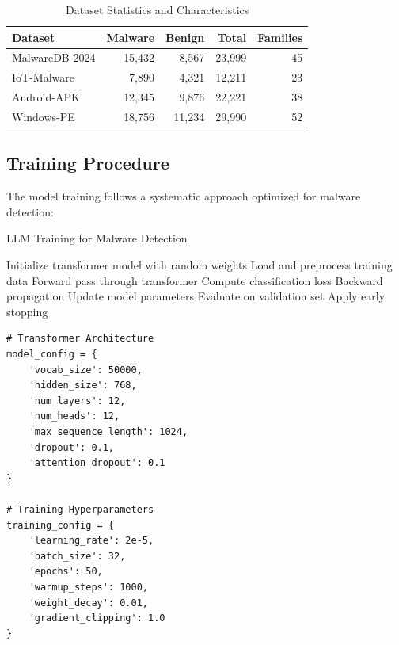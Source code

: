 \documentclass[12pt,a4paper]{article}
\begin{document}
\begin{table}[H]
    \centering
    \caption{Dataset Statistics and Characteristics}
    \begin{tabular}{@{}lrrrr@{}}
        \toprule
        Dataset        & Malware & Benign & Total  & Families \\
        \midrule
        MalwareDB-2024 & 15,432  & 8,567  & 23,999 & 45       \\
        IoT-Malware    & 7,890   & 4,321  & 12,211 & 23       \\
        Android-APK    & 12,345  & 9,876  & 22,221 & 38       \\
        Windows-PE     & 18,756  & 11,234 & 29,990 & 52       \\
        \bottomrule
    \end{tabular}
    \label{tab:datasets}
\end{table}

\subsection{Training Procedure}

The model training follows a systematic approach optimized for malware
detection:

\begin{algorithm}[H]
    \caption{LLM Training for Malware Detection}
    \begin{algorithmic}[1]
        \STATE Initialize transformer model with random weights
        \STATE Load and preprocess training data
        \STATE Forward pass through transformer
        \STATE Compute classification loss
        \STATE Backward propagation
        \STATE Update model parameters
        \ENDFOR
        \STATE Evaluate on validation set
        \STATE Apply early stopping
        \ENDIF
        \ENDFOR
    \end{algorithmic}
\end{algorithm}

\begin{lstlisting}[caption=Model Configuration Parameters]
# Transformer Architecture
model_config = {
    'vocab_size': 50000,
    'hidden_size': 768,
    'num_layers': 12,
    'num_heads': 12,
    'max_sequence_length': 1024,
    'dropout': 0.1,
    'attention_dropout': 0.1
}

# Training Hyperparameters
training_config = {
    'learning_rate': 2e-5,
    'batch_size': 32,
    'epochs': 50,
    'warmup_steps': 1000,
    'weight_decay': 0.01,
    'gradient_clipping': 1.0
}
\end{lstlisting}
\end{document}
